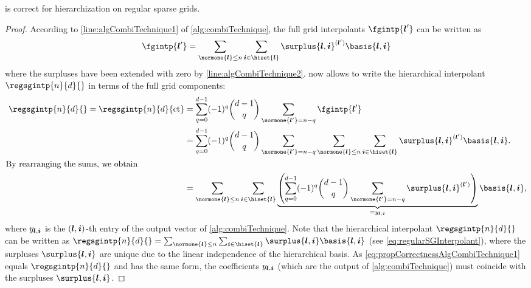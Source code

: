 \begin{proposition}
  \label{prop:correctnessAlgCombiTechnique}
  is correct for hierarchization on regular sparse grids.
\end{proposition}

\begin{proof}
  According to \cref{line:algCombiTechnique1} of \cref{alg:combiTechnique},
  the full grid interpolants $\fgintp{\*l'}$ can be written as
  \begin{equation}
    \fgintp{\*l'}
    = \sum_{\normone{\*l} \le n} \sum_{\*i \in \hiset{\*l}}
    \surplus{\*l,\*i}^{(\*l')} \basis{\*l,\*i}
  \end{equation}
  where the surpluses have been extended with zero by
  \cref{line:algCombiTechnique2}.
   now allows to write the hierarchical
  interpolant $\regsgintp{n}{d}{}$ in terms of the full grid components:
  \begin{subequations}
    \begin{align}
      \
      \regsgintp{n}{d}{}
      = \regsgintp{n}{d}{\ct}
      &= \sum_{q=0}^{d-1} (-1)^q \binom{d-1}{q} \sum_{\normone{\*l'} = n-q}
      \fgintp{\*l'}\\
      &= \sum_{q=0}^{d-1} (-1)^q \binom{d-1}{q} \sum_{\normone{\*l'} = n-q}
      \sum_{\normone{\*l} \le n} \sum_{\*i \in \hiset{\*l}}
      \surplus{\*l,\*i}^{(\*l')} \basis{\*l,\*i}.\\
      \intertext{%
        By rearranging the sums, we obtain%
      }
      \label{eq:propCorrectnessAlgCombiTechnique1}
      &= \sum_{\normone{\*l} \le n} \sum_{\*i \in \hiset{\*l}}
      \underbrace{
        \left(\sum_{q=0}^{d-1} (-1)^q \binom{d-1}{q} \sum_{\normone{\*l'} = n-q}
        \surplus{\*l,\*i}^{(\*l')}\right)
      }_{= \linout{\*l,\*i}}
      \basis{\*l,\*i},
    \end{align}
  \end{subequations}
  where $y_{{\boldsymbol{l}},{\boldsymbol{i}}}$ is the $({\boldsymbol{l}},{\boldsymbol{i}})$-th entry of the output vector
  of \cref{alg:combiTechnique}.
  Note that the hierarchical interpolant $\regsgintp{n}{d}{}$
  can be written as
  $\regsgintp{n}{d}{} = \sum_{\normone{\*l} \le n} \sum_{\*i \in \hiset{\*l}}
  \surplus{\*l,\*i} \basis{\*l,\*i}$
  (see \eqref{eq:regularSGInterpolant}),
  where the surpluses $\surplus{\*l,\*i}$ are unique due to the
  linear independence of the hierarchical basis.
  As \eqref{eq:propCorrectnessAlgCombiTechnique1}
  equals $\regsgintp{n}{d}{}$ and has the same form,
  the coefficients $y_{{\boldsymbol{l}},{\boldsymbol{i}}}$
  (which are the output of \cref{alg:combiTechnique})
  must coincide with the surpluses $\surplus{\*l,\*i}$.
\end{proof}



